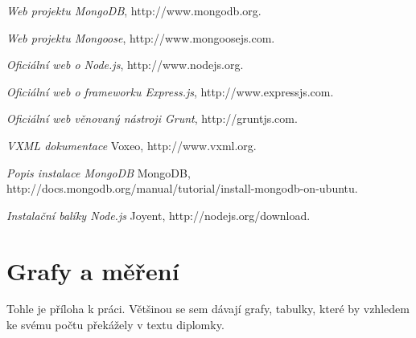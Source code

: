 \documentclass[ing,male,java,dept460]{diploma}						%
\begin{document}
\begin{thebibliography}{99}
\textit{Web projektu MongoDB}, http://www.mongodb.org.

\textit{Web projektu Mongoose}, http://www.mongoosejs.com.

\textit{Oficiální web o Node.js}, http://www.nodejs.org.

\textit{Oficiální web o frameworku Express.js}, http://www.expressjs.com.

\textit{Oficiální web věnovaný nástroji Grunt}, http://gruntjs.com.

\textit{VXML dokumentace} Voxeo, http://www.vxml.org.

\textit{Popis instalace MongoDB} MongoDB, http://docs.mongodb.org/manual/tutorial/install-mongodb-on-ubuntu.

\textit{Instalační balíky Node.js} Joyent, http://nodejs.org/download.

\end{thebibliography}

\appendix
\section{Grafy a měření}
Tohle je příloha k práci. Většinou se sem dávají grafy, tabulky, které by vzhledem
ke svému počtu překážely v textu diplomky.
\clearpage
\end{document}
